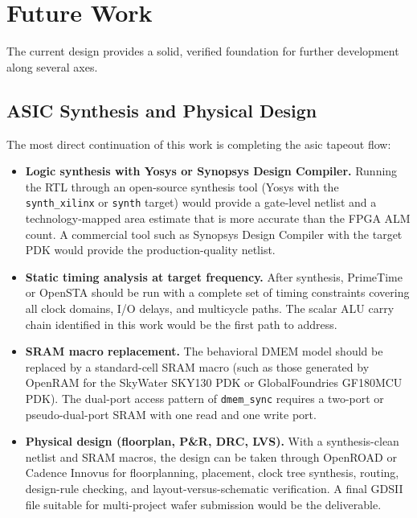 \section{Future Work}
\label{sec:future}

The current design provides a solid, verified foundation for further development
along several axes.

\subsection{ASIC Synthesis and Physical Design}

The most direct continuation of this work is completing the \gls{asic} tapeout flow:

\begin{itemize}
  \item \textbf{Logic synthesis with Yosys or Synopsys Design Compiler.}
    Running the RTL through an open-source synthesis tool (Yosys with the
    \texttt{synth\_xilinx} or \texttt{synth} target) would provide a gate-level
    netlist and a technology-mapped area estimate that is more accurate than the
    FPGA ALM count. A commercial tool such as Synopsys Design Compiler with the
    target PDK would provide the production-quality netlist.
  \item \textbf{Static timing analysis at target frequency.}
    After synthesis, PrimeTime or OpenSTA should be run with a complete set of
    timing constraints covering all clock domains, I/O delays, and multicycle paths.
    The scalar ALU carry chain identified in this work would be the first path to
    address.
  \item \textbf{SRAM macro replacement.}
    The behavioral DMEM model should be replaced by a standard-cell SRAM macro
    (such as those generated by OpenRAM for the SkyWater SKY130 PDK or
    GlobalFoundries GF180MCU PDK). The dual-port access pattern of \texttt{dmem\_sync}
    requires a two-port or pseudo-dual-port SRAM with one read and one write port.
  \item \textbf{Physical design (floorplan, P\&R, DRC, LVS).}
    With a synthesis-clean netlist and SRAM macros, the design can be taken through
    OpenROAD or Cadence Innovus for floorplanning, placement, clock tree synthesis,
    routing, design-rule checking, and layout-versus-schematic verification.
    A final GDSII file suitable for multi-project wafer submission would be the
    deliverable.
\end{itemize}

